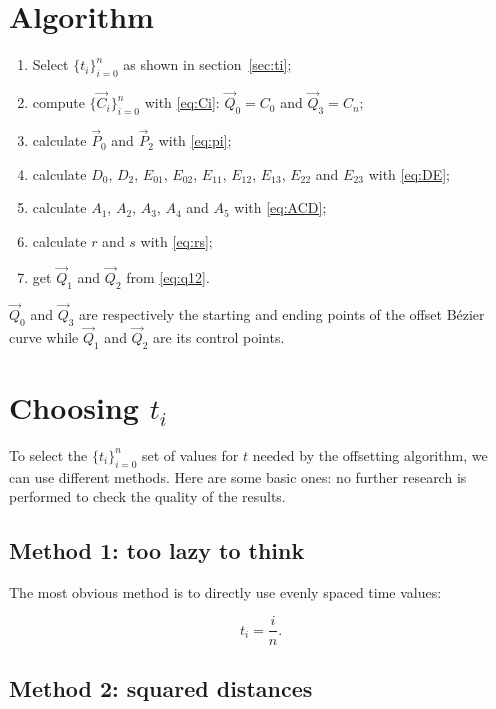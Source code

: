 \documentclass{scrartcl}
\newcommand\V[1]{\vec{#1}}
\begin{document}
\section{Algorithm}

\begin{enumerate}
    \item Select $\{t_i\}_{i=0}^n$ as shown in section~\ref{sec:ti};
    \item compute $\{\V{C}_i\}_{i=0}^n$ with \eqref{eq:Ci}:
	$\V{Q}_0 = C_0$ and $\V{Q}_3 = C_n$;
    \item calculate $\V{P}_0$ and $\V{P}_2$ with \eqref{eq:pi};
    \item calculate $D_0$, $D_2$, $E_{01}$, $E_{02}$, $E_{11}$,
	$E_{12}$, $E_{13}$, $E_{22}$ and $E_{23}$ with \eqref{eq:DE};
    \item calculate $A_1$, $A_2$, $A_3$, $A_4$ and $A_5$ with
	\eqref{eq:ACD};
    \item calculate $r$ and $s$ with \eqref{eq:rs};
    \item get $\V{Q}_1$ and $\V{Q}_2$ from \eqref{eq:q12}.
\end{enumerate}

$\V{Q}_0$ and $\V{Q}_3$ are respectively the starting and ending
points of the offset Bézier curve while $\V{Q}_1$ and $\V{Q}_2$ are
its control points.

\clearpage
\section{Choosing $t_i$\label{sec:ti}}

To select the $\{t_i\}_{i=0}^n$ set of values for $t$ needed by
the offsetting algorithm, we can use different methods. Here are some
basic ones: no further research is performed to check the quality of
the results.

\subsection{Method 1: too lazy to think}

The most obvious method is to directly use evenly spaced time values:

\begin{equation*}
    t_i = \frac{i}{n}.
\end{equation*}

\subsection{Method 2: squared distances}
\end{document}
